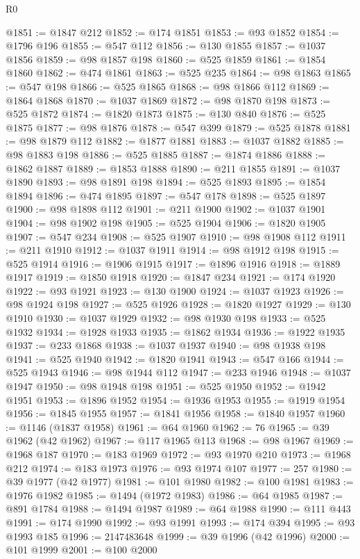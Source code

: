 \begin{lexlean}{R0}
\begin{coremodule}
@1851 := @1847 @212
@1852 := @174 @1851
@1853 := @93 @1852
@1854 := @1796 @196
@1855 := @547 @112
@1856 := @130 @1855
@1857 := @1037 @1856
@1859 := @98 @1857 @198
@1860 := @525 @1859
@1861 := @1854 @1860
@1862 := @474 @1861
@1863 := @525 @235
@1864 := @98 @1863
@1865 := @547 @198
@1866 := @525 @1865
@1868 := @98 @1866 @112
@1869 := @1864 @1868
@1870 := @1037 @1869
@1872 := @98 @1870 @198
@1873 := @525 @1872
@1874 := @1820 @1873
@1875 := @130 @840
@1876 := @525 @1875
@1877 := @98 @1876
@1878 := @547 @399
@1879 := @525 @1878
@1881 := @98 @1879 @112
@1882 := @1877 @1881
@1883 := @1037 @1882
@1885 := @98 @1883 @198
@1886 := @525 @1885
@1887 := @1874 @1886
@1888 := @1862 @1887
@1889 := @1853 @1888
@1890 := @211 @1855
@1891 := @1037 @1890
@1893 := @98 @1891 @198
@1894 := @525 @1893
@1895 := @1854 @1894
@1896 := @474 @1895
@1897 := @547 @178
@1898 := @525 @1897
@1900 := @98 @1898 @112
@1901 := @211 @1900
@1902 := @1037 @1901
@1904 := @98 @1902 @198
@1905 := @525 @1904
@1906 := @1820 @1905
@1907 := @547 @234
@1908 := @525 @1907
@1910 := @98 @1908 @112
@1911 := @211 @1910
@1912 := @1037 @1911
@1914 := @98 @1912 @198
@1915 := @525 @1914
@1916 := @1906 @1915
@1917 := @1896 @1916
@1918 := @1889 @1917
@1919 := @1850 @1918
@1920 := @1847 @234
@1921 := @174 @1920
@1922 := @93 @1921
@1923 := @130 @1900
@1924 := @1037 @1923
@1926 := @98 @1924 @198
@1927 := @525 @1926
@1928 := @1820 @1927
@1929 := @130 @1910
@1930 := @1037 @1929
@1932 := @98 @1930 @198
@1933 := @525 @1932
@1934 := @1928 @1933
@1935 := @1862 @1934
@1936 := @1922 @1935
@1937 := @233 @1868
@1938 := @1037 @1937
@1940 := @98 @1938 @198
@1941 := @525 @1940
@1942 := @1820 @1941
@1943 := @547 @166
@1944 := @525 @1943
@1946 := @98 @1944 @112
@1947 := @233 @1946
@1948 := @1037 @1947
@1950 := @98 @1948 @198
@1951 := @525 @1950
@1952 := @1942 @1951
@1953 := @1896 @1952
@1954 := @1936 @1953
@1955 := @1919 @1954
@1956 := @1845 @1955
@1957 := @1841 @1956
@1958 := @1840 @1957
@1960 := @1146 (@1837 @1958)
@1961 := @64 @1960
@1962 := 76
@1965 := @39 @1962 (@42 @1962)
@1967 := @117 @1965 @113
@1968 := @98 @1967
@1969 := @1968 @187
@1970 := @183 @1969
@1972 := @93 @1970 @210
@1973 := @1968 @212
@1974 := @183 @1973
@1976 := @93 @1974 @107
@1977 := 257
@1980 := @39 @1977 (@42 @1977)
@1981 := @101 @1980
@1982 := @100 @1981
@1983 := @1976 @1982
@1985 := @1494 (@1972 @1983)
@1986 := @64 @1985
@1987 := @891 @1784
@1988 := @1494 @1987
@1989 := @64 @1988
@1990 := @111 @443
@1991 := @174 @1990
@1992 := @93 @1991
@1993 := @174 @394
@1995 := @93 @1993 @185
@1996 := 2147483648
@1999 := @39 @1996 (@42 @1996)
@2000 := @101 @1999
@2001 := @100 @2000

\end{coremodule}
\end{lexlean}
